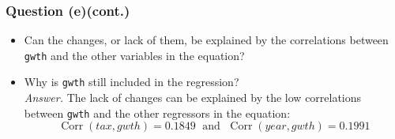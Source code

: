 \documentclass[11pt, xcolor=x11names,compress]{beamer}
\DeclareMathOperator{\Corr}{\text{Corr}}
\begin{document}
\begin{frame}
\frametitle{Question (e)(cont.)}
\begin{itemize}
    \item Can the changes, or lack of them, be explained by the correlations between \texttt{gwth} and the other variables in the equation?\\
    \item Why is \texttt{gwth} still included in the regression?\\
\pause
\vspace{3mm}
\textit{Answer.}
The lack of changes can be explained by the low correlations between \texttt{gwth} and the other regressors in the equation: 
$$\Corr(tax, gwth) =0.1849 \; \text{ and } \; \Corr(year, gwth)=0.1991$$
\end{itemize}
\end{frame}
\end{document}
